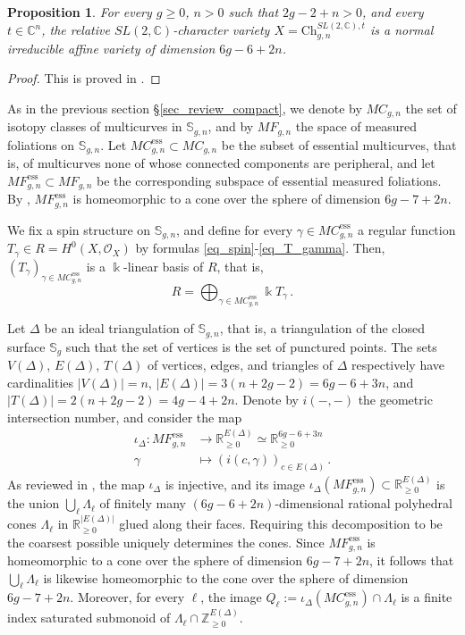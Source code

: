 \documentclass[12pt,letterpaper, reqno]{amsart}
\newtheorem{proposition}[theorem]{Proposition}
\theoremstyle{defstyle} \newtheorem{definition}[theorem]{Definition}
\theoremstyle{remark}
\numberwithin{equation}{section}
\numberwithin{figure}{section}
\newcommand{\kk} {\Bbbk}
\newcommand{\CC} {\mathbb{C}}
\newcommand{\bS} {\mathbb{S}}
\newcommand{\cO} {\mathcal{O}}
\newcommand{\RR} {\mathbb{R}}
\newcommand{\ZZ} {\mathbb{Z}}
\begin{document}
\begin{proposition} \label{prop_normal_punctured}
    For every $g \geq 0$, $n>0$ such that $2g-2+n>0$, and every $t \in \CC^n$, the relative $SL(2,\CC)$-character variety $X=\mathrm{Ch}_{g,n}^{SL(2,\CC), t}$ is a normal irreducible affine variety of dimension $6g-6+2n$.
\end{proposition}

\begin{proof}
This is proved in \cite[Theorem 1.1]{MR4157427}.
\end{proof}

As in the previous section \S\ref{sec_review_compact}, we denote by $MC_{g,n}$ the set of isotopy classes of multicurves in $\bS_{g,n}$, and by $MF_{g,n}$ the space of measured foliations on $\bS_{g,n}$. Let 
$MC_{g,n}^{\mathrm{ess}} \subset MC_{g,n}$ be the subset of essential multicurves, 
that is, of multicurves none of whose connected components are peripheral, and let $MF_{g,n}^{\mathrm{ess}} \subset MF_{g,n}$ be the corresponding subspace of essential measured foliations. By \cite[Theorem 11.1]{thurston}, $MF_{g,n}^{\mathrm{ess}}$ is homeomorphic to a cone over the sphere of dimension $6g-7+2n$.

We fix a spin structure on $\bS_{g,n}$, and define for every $\gamma \in MC_{g,n}^{\mathrm{ess}}$ a regular function $T_\gamma \in R=H^0(X,\cO_X)$ by formulas \eqref{eq_spin}-\eqref{eq_T_gamma}. Then, $(T_\gamma)_{\gamma \in MC_{g,n}^{\mathrm{ess}}}$ is a $\kk$-linear basis of $R$, that is, 
\[ R = \bigoplus_{\gamma \in MC_{g,n}^{\mathrm{ess}}} \kk T_\gamma \,.\]

Let $\Delta$ be an ideal triangulation of $\bS_{g,n}$, that is, a triangulation of the closed surface $\bS_g$ such that the set of vertices is the set of
punctured points. The sets $V(\Delta)$, $E(\Delta)$, $T(\Delta)$  of vertices, edges, and triangles of $\Delta$ respectively have cardinalities $|V(\Delta)|=n$, 
$|E(\Delta)|=3(n+2g-2)=6g-6+3n$, and $|T(\Delta)|=2(n+2g-2)=4g-4+2n$.
Denote by $i(-,-)$ the geometric intersection number, and consider the map
\begin{align} \label{eq_iota_Delta}
\iota_\Delta: MF_{g,n}^{\mathrm{ess}} &\longrightarrow \RR_{\geq 0}^{E(\Delta)} \simeq \RR_{\geq 0}^{6g-6+3n} 
\\ \nonumber
\gamma &\longmapsto (i(c,\gamma))_{c\in E(\Delta)} \,.
\end{align}
As reviewed in \cite[\S 2.3]{farajzadeh2023compactifications}, the map $\iota_\Delta$ is injective, and its image $\iota_\Delta(MF_{g,n}^{\mathrm{ess}}) \subset \RR_{\geq 0}^{E(\Delta)}$ is 
the union $\bigcup_{\ell} \Lambda_\ell$ of finitely many $(6g-6+2n)$-dimensional rational polyhedral cones $\Lambda_\ell$ in $\RR_{\geq 0}^{|E(\Delta)|}$ glued along their faces. Requiring this decomposition to be the coarsest possible uniquely determines the cones. Since $MF_{g,n}^{\mathrm{ess}}$ is homeomorphic to a cone over the sphere of dimension $6g-7+2n$, it follows that $\bigcup_\ell \Lambda_\ell$ is likewise homeomorphic to the cone over the sphere of dimension $6g-7+2n$. Moreover, for every $\ell$, the image 
$Q_\ell := \iota_\Delta(MC_{g,n}^{\mathrm{ess}}) \cap \Lambda_\ell$ is a finite index saturated submonoid of $\Lambda_\ell \cap \ZZ_{\geq 0}^{E(\Delta)}$.
\end{document}
